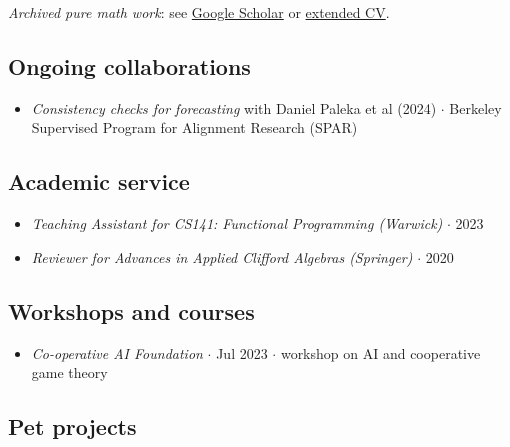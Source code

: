 \documentclass{article}
\begin{document}
\emph{Archived pure math work}: see \href{https://scholar.google.co.in/citations?user=lb38BjYAAAAJ&hl=en}{Google Scholar} or \href{https://drive.google.com/file/d/1_VStBkw6DthYNyp4F3Xx2THInWLpNrHK/view?usp=drive_link}{extended CV}.

\subsection*{Ongoing collaborations}

\begin{itemize}
    
    \item \emph{Consistency checks for forecasting} with Daniel Paleka et al (2024) $\cdot$ Berkeley Supervised Program for Alignment Research (SPAR)

\end{itemize}


\subsection*{Academic service}

\begin{itemize}

    \item \emph{Teaching Assistant for CS141: Functional Programming (Warwick)} $\cdot$ 2023
    
    \item \emph{Reviewer for Advances in Applied Clifford Algebras (Springer)} $\cdot$ 2020

\end{itemize}

\subsection*{Workshops and courses}

\begin{itemize}

    \item \emph{Co-operative AI Foundation} $\cdot$ Jul 2023 $\cdot$ workshop on AI and cooperative game theory

\end{itemize}

\subsection*{Pet projects}
\end{document}
